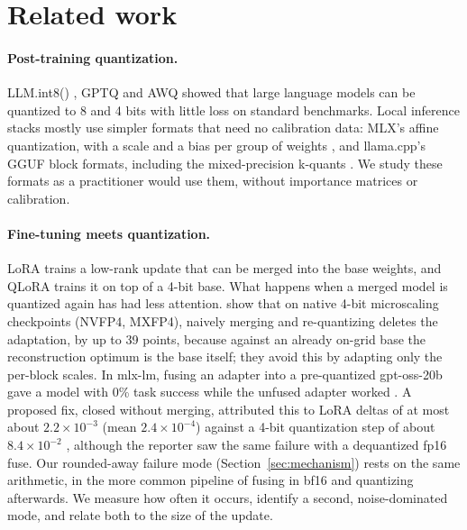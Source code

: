 \documentclass[11pt,letterpaper]{article}
\begin{document}
\section{Related work}
\label{sec:related}

\paragraph{Post-training quantization.} LLM.int8() \citep{dettmers2022llmint8}, GPTQ \citep{frantar2023gptq} and AWQ \citep{lin2024awq} showed that large language models can be quantized to 8 and 4 bits with little loss on standard benchmarks. Local inference stacks mostly use simpler formats that need no calibration data: MLX's affine quantization, with a scale and a bias per group of weights \citep{mlx2023}, and llama.cpp's GGUF block formats, including the mixed-precision k-quants \citep{llamacpp}. We study these formats as a practitioner would use them, without importance matrices or calibration.

\paragraph{Fine-tuning meets quantization.} LoRA \citep{hu2022lora} trains a low-rank update that can be merged into the base weights, and QLoRA \citep{dettmers2023qlora} trains it on top of a 4-bit base. What happens when a merged model is quantized again has had less attention. \citet{li2026scaleqlora} show that on native 4-bit microscaling checkpoints (NVFP4, MXFP4), naively merging and re-quantizing deletes the adaptation, by up to 39 points, because against an already on-grid base the reconstruction optimum is the base itself; they avoid this by adapting only the per-block scales. In mlx-lm, fusing an adapter into a pre-quantized gpt-oss-20b gave a model with 0\% task success while the unfused adapter worked \citep{mlxlm1172}. A proposed fix, closed without merging, attributed this to LoRA deltas of at most about $2.2\times10^{-3}$ (mean $2.4\times10^{-4}$) against a 4-bit quantization step of about $8.4\times10^{-2}$ \citep{mlxlm1564}, although the reporter saw the same failure with a dequantized fp16 fuse. Our rounded-away failure mode (Section~\ref{sec:mechanism}) rests on the same arithmetic, in the more common pipeline of fusing in bf16 and quantizing afterwards. We measure how often it occurs, identify a second, noise-dominated mode, and relate both to the size of the update.
\end{document}

